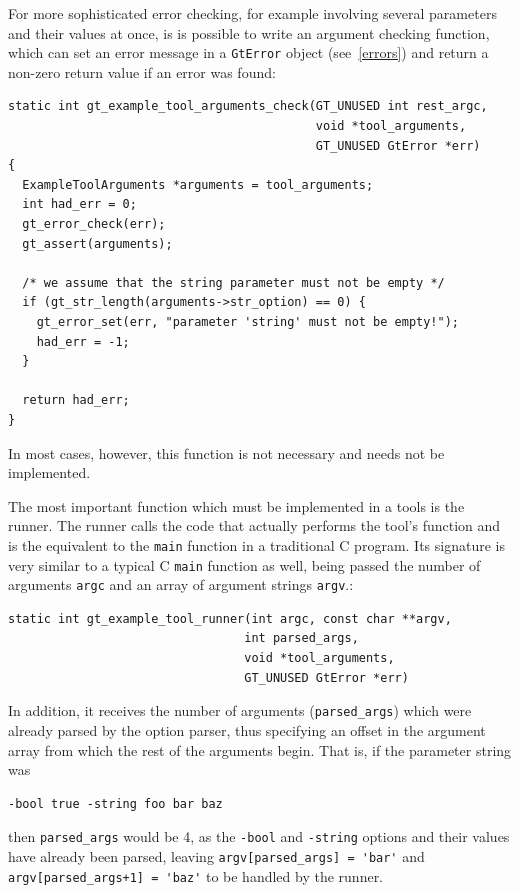 \documentclass[11pt,final]{article}
\newcommand{\keyword}[1]{\lstinline{#1}}
\begin{document}
For more sophisticated error checking, for example involving several parameters
and their values at once, is is possible to write an argument checking function,
which can set an error message in a \keyword{GtError} object (see~\ref{errors})
and return a non-zero return value if an error was found:

\begin{lstlisting}
static int gt_example_tool_arguments_check(GT_UNUSED int rest_argc,
                                           void *tool_arguments,
                                           GT_UNUSED GtError *err)
{
  ExampleToolArguments *arguments = tool_arguments;
  int had_err = 0;
  gt_error_check(err);
  gt_assert(arguments);

  /* we assume that the string parameter must not be empty */
  if (gt_str_length(arguments->str_option) == 0) {
    gt_error_set(err, "parameter 'string' must not be empty!");
    had_err = -1;
  }

  return had_err;
}
\end{lstlisting}

In most cases, however, this function is not necessary and needs not be
implemented.

The most important function which must be implemented in a tools is the runner.
The runner calls the code that actually performs the tool's function and is the
equivalent to the \keyword{main} function in a traditional C program.
Its signature is very similar to a typical C \keyword{main} function as well,
being passed the number of arguments \keyword{argc} and an array of argument
strings \keyword{argv}.:

\begin{lstlisting}
static int gt_example_tool_runner(int argc, const char **argv,
                                 int parsed_args,
                                 void *tool_arguments,
                                 GT_UNUSED GtError *err)
\end{lstlisting}

In addition, it receives the number of arguments (\keyword{parsed_args}) which
were already parsed by the option parser, thus specifying an offset in the
argument array from which the rest of the arguments begin.
That is, if the parameter string was

\begin{lstlisting}
-bool true -string foo bar baz
\end{lstlisting}

then  \keyword{parsed_args} would be 4, as the \keyword{-bool} and
\keyword{-string} options and their values have already been parsed,
leaving \keyword{argv[parsed_args] = 'bar'} and
\keyword{argv[parsed_args+1] = 'baz'} to be handled by the runner.
\end{document}
